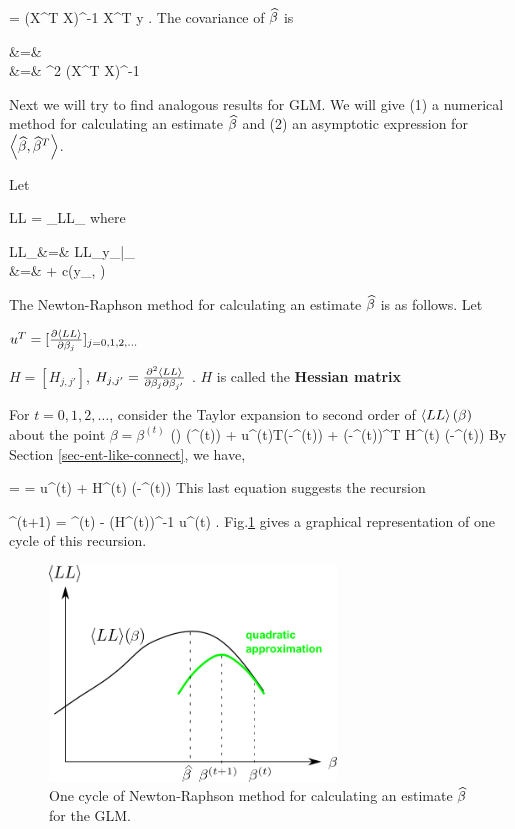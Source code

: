 \beq
\HAT{\beta}=
(X^T X)^{-1} X^T y
\;.
\eeq
The covariance of ${\widehat{\beta}}$ is

\beqa
{}
&=&
\\
&=&
\s^2  (X^T X)^{-1}
\eeqa

Next
we will try to find analogous results for GLM.
We will give (1) a numerical method
for calculating an estimate
${\widehat{\beta}}$
and (2) an asymptotic
expression for
$\left\langle{\widehat{\beta}}, {\widehat{\beta}}^T\right\rangle$.

Let

\beq
 LL =  \sum_\s  LL_\s
\eeq
where

\beqa
 LL_\s &=&   LL_{y_\s|\theta_\s }
\\
&=&
 + c(y_\s, \phi)
\eeqa

The
Newton-Raphson method for calculating an
estimate ${\widehat{\beta}}$ is as follows. Let

$u^T = [\frac{\partial\left\langle LL\right\rangle}{\partial\beta_j}]_{j=0,1,2, \ldots}$

 $H= [H_{j, j'}]$, $H_{j, j'} =
\frac{\partial^2 \left\langle LL\right\rangle }{\partial\beta_j\partial\beta_{j'}}$ .
$H$ is called the {\bf Hessian matrix}

For $t=0, 1, 2,\ldots$, consider the
Taylor expansion  to second order
of $\left\langle LL\right\rangle(\beta)$  about  the
point $\beta= \beta^{(t)}$
\beq
{}(\beta)
\approx
{}(\beta^{(t)})
+ u^{(t)T}(\beta-\beta^{(t)})
+ 
(\beta-\beta^{(t)})^T H^{(t)} (\beta-\beta^{(t)})
\eeq
 By Section \ref{sec-ent-like-connect}, we have,

 =
=
u^{(t)}
+
H^{(t)} (\beta-\beta^{(t)})
\eeq
This last equation suggests the recursion

\beq
\beta^{(t+1)} =
\beta^{(t)} -  (H^{(t)})^{-1} u^{(t)}
\;.
\eeq
Fig.\ref{fig-gml-new-rap}
gives a graphical
representation of
one cycle of this recursion.


\begin{figure}[h!]
\centering
\includegraphics[width=3in]
{gen-lin-mod/gen-lin-mod.png}
\caption{One cycle of Newton-Raphson method
for calculating an estimate ${\widehat{\beta}}$ for the GLM.}
\label{fig-gml-new-rap}
\end{figure}





